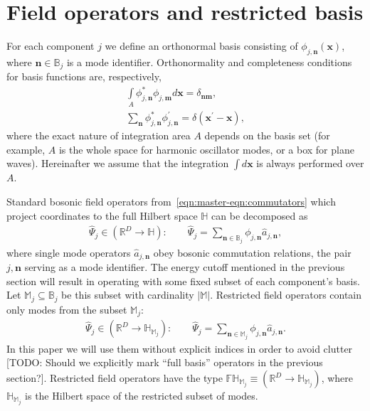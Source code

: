 \documentclass[12pt,aip,jmp,amssymb,amsmath]{revtex4-1}
\begin{document}
\section{Field operators and restricted basis}
\label{sec:func-operators}

For each component $j$ we define an orthonormal basis consisting of $\phi_{j,\boldsymbol{n}}(\boldsymbol{x})$, where $\boldsymbol{n} \in \mathbb{B}_j$ is a mode identifier.
Orthonormality and completeness conditions for basis functions are, respectively,
\begin{align}
    \int\limits_A \phi_{j,\boldsymbol{n}}^* \phi_{j,\boldsymbol{m}} d\boldsymbol{x} = \delta_{\boldsymbol{n}\boldsymbol{m}}, \\
    \sum_{\boldsymbol{n}} \phi_{j,\boldsymbol{n}}^* \phi_{j,\boldsymbol{n}}^\prime = \delta(\boldsymbol{x}^\prime - \boldsymbol{x}),
\end{align}
where the exact nature of integration area $A$ depends on the basis set (for example, $A$ is the whole space for harmonic oscillator modes, or a box for plane waves).
Hereinafter we assume that the integration $\int d\boldsymbol{x}$ is always performed over $A$.

Standard bosonic field operators from~\ref{eqn:master-eqn:commutators} which project coordinates to the full Hilbert space $\mathbb{H}$ can be decomposed as
\begin{equation}\begin{split}
    \hat{\Psi}_j \in (\mathbb{R}^D \rightarrow \mathbb{H}): \qquad
    \hat{\Psi}_j = \sum_{\boldsymbol{n} \in \mathbb{B}_j} \phi_{j,\boldsymbol{n}} \hat{a}_{j,\boldsymbol{n}},
\end{split}\end{equation}
where single mode operators $\hat{a}_{j,\boldsymbol{n}}$ obey bosonic commutation relations, the pair $j,\boldsymbol{n}$ serving as a mode identifier.
The energy cutoff mentioned in the previous section will result in operating with some fixed subset of each component's basis.
Let $\mathbb{M}_j \subseteq \mathbb{B}_j$ be this subset with cardinality $|\mathbb{M}|$.
Restricted field operators contain only modes from the subset $\mathbb{M}_j$:
\begin{equation}\begin{split}
    \hat{\Psi}_j \in (\mathbb{R}^D \rightarrow \mathbb{H}_{\mathbb{M}_j}): \qquad
    \hat{\Psi}_j = \sum_{\boldsymbol{n} \in \mathbb{M}_j} \phi_{j,\boldsymbol{n}} \hat{a}_{j,\boldsymbol{n}}.
\end{split}\end{equation}
In this paper we will use them without explicit indices in order to avoid clutter [TODO: Should we explicitly mark ``full basis'' operators in the previous section?].
Restricted field operators have the type $\mathbb{FH}_{\mathbb{M}_j} \equiv (\mathbb{R}^D \rightarrow \mathbb{H}_{\mathbb{M}_j})$, where $\mathbb{H}_{\mathbb{M}_j}$ is the Hilbert space of the restricted subset of modes.
\end{document}
